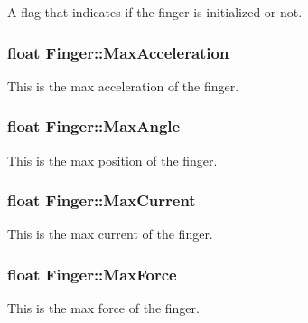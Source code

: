 A flag that indicates if the finger is initialized or not. 

\subsubsection[{\texorpdfstring{Max\+Acceleration}{MaxAcceleration}}]{\setlength{\rightskip}{0pt plus 5cm}float Finger\+::\+Max\+Acceleration}\hypertarget{struct_finger_a383fb587571f0e8b6bc1713499973763}{}\label{struct_finger_a383fb587571f0e8b6bc1713499973763}


This is the max acceleration of the finger. 

\subsubsection[{\texorpdfstring{Max\+Angle}{MaxAngle}}]{\setlength{\rightskip}{0pt plus 5cm}float Finger\+::\+Max\+Angle}\hypertarget{struct_finger_a1e03293d942b0d44d937b21769192d2a}{}\label{struct_finger_a1e03293d942b0d44d937b21769192d2a}


This is the max position of the finger. 

\subsubsection[{\texorpdfstring{Max\+Current}{MaxCurrent}}]{\setlength{\rightskip}{0pt plus 5cm}float Finger\+::\+Max\+Current}\hypertarget{struct_finger_a0ee68473cfae080e2ab4140ae28831ce}{}\label{struct_finger_a0ee68473cfae080e2ab4140ae28831ce}


This is the max current of the finger. 

\subsubsection[{\texorpdfstring{Max\+Force}{MaxForce}}]{\setlength{\rightskip}{0pt plus 5cm}float Finger\+::\+Max\+Force}\hypertarget{struct_finger_aac1ffdc3d2b9d2cd23d90b76e39e892c}{}\label{struct_finger_aac1ffdc3d2b9d2cd23d90b76e39e892c}


This is the max force of the finger. 

